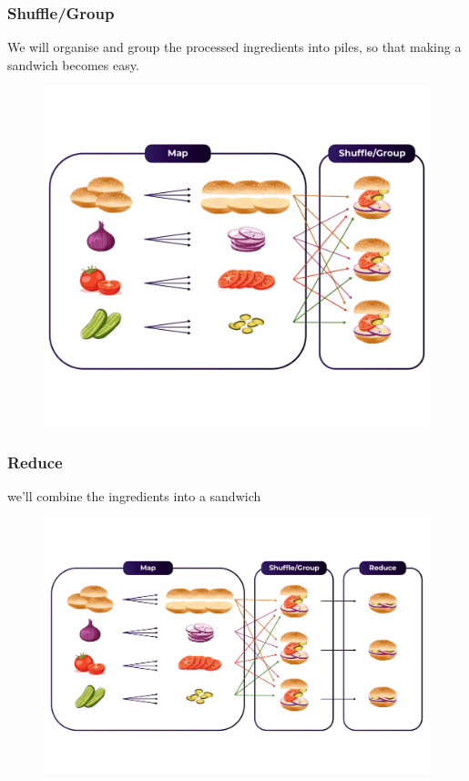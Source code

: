\begin{frame}
    \frametitle{Shuffle/Group}
    We will organise and group the processed ingredients into piles, so that making a sandwich becomes easy.
    \begin{figure}
        \includegraphics[width=.7\textwidth,height=.8\textheight]{./Figures/chapter-04/map_shuffle}\label{fig:map_shuffle}
    \end{figure}
\end{frame}
\begin{frame}
    \frametitle{Reduce}
    we’ll combine the ingredients into a sandwich
    \begin{figure}
        \includegraphics[width=.96\textwidth,height=.6\textheight]{./Figures/chapter-04/map_reduce}\label{fig:map_reduce}
    \end{figure}
\end{frame}
